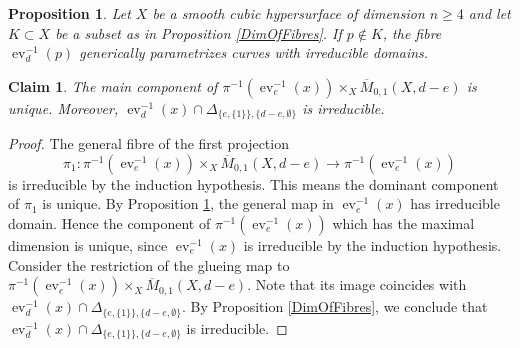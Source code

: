 \documentclass[10pt,a4paper]{amsart}
\newtheorem{prop}{Proposition}
\newtheorem{claim}{Claim}
\DeclareMathOperator{\ev}{ev}
\newcommand{\ol}{\overline}
\newcommand{\ra}{\rightarrow}
\begin{document}
	\begin{prop}\label{IrredDomain}
		Let $X$ be a smooth cubic hypersurface of dimension $n\geq4$ and let $K\subset X$ be a subset as in Proposition \ref{DimOfFibres}. If $p\notin K$, the fibre $\ev_d^{-1}(p)$ generically parametrizes curves with irreducible domains.
	\end{prop}

		\begin{claim}\label{claim1}
			The main component of $\pi^{-1}(\ev_e^{-1}(x))\times_X\ol{M}_{0,1}(X,d-e)$ is unique. Moreover, $\ev_d^{-1}(x)\cap\Delta_{\{e,\{1\}\},\{d-e,\emptyset\}}$ is irreducible.
		\end{claim}

			\begin{proof}
				The general fibre of the first projection
				$$\pi_1:\pi^{-1}(\ev_e^{-1}(x))\times_X\ol{M}_{0,1}(X,d-e)\ra\pi^{-1}(\ev_e^{-1}(x))$$
				is irreducible by the induction hypothesis. This means the dominant component of $\pi_1$ is unique.
				By Proposition \ref{IrredDomain}, the general map in $\ev_e^{-1}(x)$ has irreducible domain. Hence the component of $\pi^{-1}(\ev_e^{-1}(x))$ which has the maximal dimension is unique, since $\ev_e^{-1}(x)$ is irreducible by the induction hypothesis. Consider the restriction of the glueing map to $\pi^{-1}(\ev_e^{-1}(x))\times_X\ol{M}_{0,1}(X,d-e)$. Note that its image coincides with $\ev_d^{-1}(x)\cap\Delta_{\{e,\{1\}\},\{d-e,\emptyset\}}$. By Proposition \ref{DimOfFibres}, we conclude that $\ev_d^{-1}(x)\cap\Delta_{\{e,\{1\}\},\{d-e,\emptyset\}}$ is irreducible.
			\end{proof}
\end{document}
